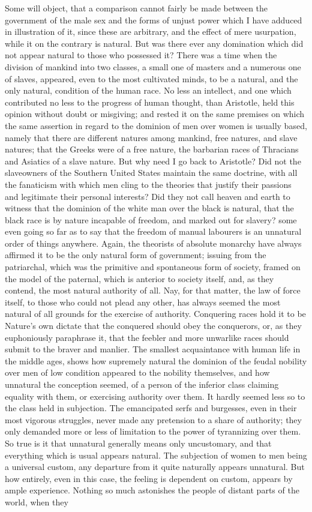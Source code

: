 \documentclass[12pt]{report}
\begin{document}
Some will object, that a comparison cannot fairly be made between the government of the male sex and the forms of unjust power which I have adduced in illustration of it, since these are arbitrary, and the effect of mere usurpation, while it on the contrary is natural. But was there ever any domination which did not appear natural to those who possessed it? There was a time when the division of mankind into two classes, a small one of masters and a numerous one of slaves, appeared, even to the most cultivated minds, to be a natural, and the only natural, condition of the human race. No less an intellect, and one which contributed no less to the progress of human thought, than Aristotle, held this opinion without doubt or misgiving; and rested it on the same premises on which the same assertion in regard to the dominion of men over women is usually based, namely that there are different natures among mankind, free natures, and slave natures; that the Greeks were of a free nature, the barbarian races of Thracians and Asiatics of a slave nature. But why need I go back to Aristotle? Did not the slaveowners of the Southern United States maintain the same doctrine, with all the fanaticism with which men cling to the theories that justify their passions and legitimate their personal interests? Did they not call heaven and earth to witness that the dominion of the white man over the black is natural, that the black race is by nature incapable of freedom, and marked out for slavery? some even going so far as to say that the freedom of manual labourers is an unnatural order of things anywhere. Again, the theorists of absolute monarchy have always affirmed it to be the only natural form of government; issuing from the patriarchal, which was the primitive and spontaneous form of society, framed on the model of the paternal, which is anterior to society itself, and, as they contend, the most natural authority of all. Nay, for that matter, the law of force itself, to those who could not plead any other, has always seemed the most natural of all grounds for the exercise of authority. Conquering races hold it to be Nature's own dictate that the conquered should obey the conquerors, or, as they euphoniously paraphrase it, that the feebler and more unwarlike races should submit to the braver and manlier. The smallest acquaintance with human life in the middle ages, shows how supremely natural the dominion of the feudal nobility over men of low condition appeared to the nobility themselves, and how unnatural the conception seemed, of a person of the inferior class claiming equality with them, or exercising authority over them. It hardly seemed less so to the class held in subjection. The emancipated serfs and burgesses, even in their most vigorous struggles, never made any pretension to a share of authority; they only demanded more or less of limitation to the power of tyrannizing over them. So true is it that unnatural generally means only uncustomary, and that everything which is usual appears natural. The subjection of women to men being a universal custom, any departure from it quite naturally appears unnatural. But how entirely, even in this case, the feeling is dependent on custom, appears by ample experience. Nothing so much astonishes the people of distant parts of the world, when they 
\end{document}
